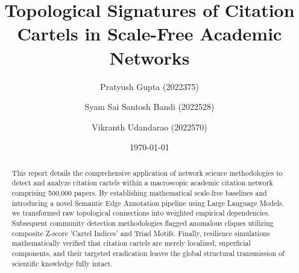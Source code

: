 \usepackage[dvipsnames]{xcolor}
\usepackage[colorlinks=true, linkcolor=MidnightBlue, citecolor=MidnightBlue, urlcolor=MidnightBlue, bookmarks=true]{hyperref}

\graphicspath{{graph_analysis_outputs/}{./}}


\title{\vspace{-1cm}\huge\textbf{Topological Signatures of Citation Cartels in Scale-Free Academic Networks}}
\author{Pratyush Gupta (2022375)}
\author{Syam Sai Santosh Bandi (2022528)}
\author{Vikranth Udandarao (2022570)}
\date{\vspace{-0.5cm}\today}



\maketitle

\begin{abstract}
\noindent This report details the comprehensive application of network science methodologies to detect and analyze citation cartels within a macroscopic academic citation network comprising 500,000 papers. By establishing mathematical scale-free baselines and introducing a novel Semantic Edge Annotation pipeline using Large Language Models, we transformed raw topological connections into weighted empirical dependencies. Subsequent community detection methodologies flagged anomalous cliques utilizing composite Z-score 'Cartel Indices' and Triad Motifs. Finally, resilience simulations mathematically verified that citation cartels are merely localized, superficial components, and their targeted eradication leaves the global structural transmission of scientific knowledge fully intact. 
\end{abstract}

\vspace{0.5cm}

